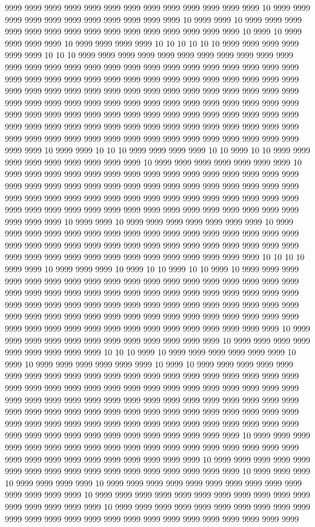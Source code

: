 9999 9999 9999 9999 9999 9999 9999 9999 9999 9999 9999 9999 9999 10 9999 9999 9999 9999 9999 9999 9999 9999 9999 9999 9999 10 9999 9999 10 9999 9999 9999 9999 9999 9999 9999 9999 9999 9999 9999 9999 9999 9999 9999 10 9999 10 9999 9999 9999 9999 10 9999 9999 9999 9999 10 10 10 10 10 10 9999 9999 9999 9999 9999 9999 10 10 10 9999 9999 9999 9999 9999 9999 9999 9999 9999 9999 9999 9999 9999 9999 9999 9999 9999 9999 9999 9999 9999 9999 9999 9999 9999 9999 9999 9999 9999 9999 9999 9999 9999 9999 9999 9999 9999 9999 9999 9999 9999 9999 9999 9999 9999 9999 9999 9999 9999 9999 9999 9999 9999 9999 9999 9999 9999 9999 9999 9999 9999 9999 9999 9999 9999 9999 9999 9999 9999 9999 9999 9999 9999 9999 9999 9999 9999 9999 9999 9999 9999 9999 9999 9999 9999 9999 9999 9999 9999 9999 9999 9999 9999 9999 9999 9999 9999 9999 9999 9999 9999 9999 9999 9999 9999 9999 9999 9999 9999 9999 9999 9999 9999 9999 9999 9999 9999 9999 10 9999 9999 10 10 10 9999 9999 9999 9999 10 10 9999 10 10 9999 9999 9999 9999 9999 9999 9999 9999 9999 10 9999 9999 9999 9999 9999 9999 9999 10 9999 9999 9999 9999 9999 9999 9999 9999 9999 9999 9999 9999 9999 9999 9999 9999 9999 9999 9999 9999 9999 9999 9999 9999 9999 9999 9999 9999 9999 9999 9999 9999 9999 9999 9999 9999 9999 9999 9999 9999 9999 9999 9999 9999 9999 9999 9999 9999 9999 9999 9999 9999 9999 9999 9999 9999 9999 9999 9999 9999 9999 9999 9999 10 9999 9999 10 9999 9999 9999 9999 9999 9999 9999 10 9999 9999 9999 9999 9999 9999 9999 9999 9999 9999 9999 9999 9999 9999 9999 9999 9999 9999 9999 9999 9999 9999 9999 9999 9999 9999 9999 9999 9999 9999 9999 9999 9999 9999 9999 9999 9999 9999 9999 9999 9999 9999 9999 9999 10 10 10 10 9999 9999 10 9999 9999 9999 10 9999 10 10 9999 10 10 9999 10 9999 9999 9999 9999 9999 9999 9999 9999 9999 9999 9999 9999 9999 9999 9999 9999 9999 9999 9999 9999 9999 9999 9999 9999 9999 9999 9999 9999 9999 9999 9999 9999 9999 9999 9999 9999 9999 9999 9999 9999 9999 9999 9999 9999 9999 9999 9999 9999 9999 9999 9999 9999 9999 9999 9999 9999 9999 9999 9999 9999 9999 9999 9999 9999 9999 9999 9999 9999 9999 9999 9999 9999 9999 9999 9999 9999 9999 10 9999 9999 9999 9999 9999 9999 9999 9999 9999 9999 9999 9999 10 9999 9999 9999 9999 9999 9999 9999 9999 9999 10 10 10 9999 10 9999 9999 9999 9999 9999 9999 10 9999 10 9999 9999 9999 9999 9999 9999 10 9999 10 9999 9999 9999 9999 9999 9999 9999 9999 9999 9999 9999 9999 9999 9999 9999 9999 9999 9999 9999 9999 9999 9999 9999 9999 9999 9999 9999 9999 9999 9999 9999 9999 9999 9999 9999 9999 9999 9999 9999 9999 9999 9999 9999 9999 9999 9999 9999 9999 9999 9999 9999 9999 9999 9999 9999 9999 9999 9999 9999 9999 9999 9999 9999 9999 9999 9999 9999 9999 9999 9999 9999 9999 9999 9999 9999 9999 9999 9999 9999 9999 9999 9999 9999 9999 9999 9999 9999 9999 9999 9999 9999 9999 10 9999 9999 9999 9999 9999 9999 9999 9999 9999 9999 9999 9999 9999 9999 9999 9999 9999 9999 9999 9999 9999 9999 9999 9999 9999 9999 9999 9999 10 9999 9999 9999 9999 9999 9999 9999 9999 9999 9999 9999 9999 9999 9999 9999 9999 9999 10 9999 9999 9999 10 9999 9999 9999 9999 10 9999 9999 9999 9999 9999 9999 9999 9999 9999 9999 9999 9999 9999 9999 10 9999 9999 9999 9999 9999 9999 9999 9999 9999 9999 9999 9999 9999 9999 9999 9999 10 9999 9999 9999 9999 9999 9999 9999 9999 9999 9999 9999 9999 9999 9999 9999 9999 9999 9999 9999 9999 9999 9999 9999 9999 9999 